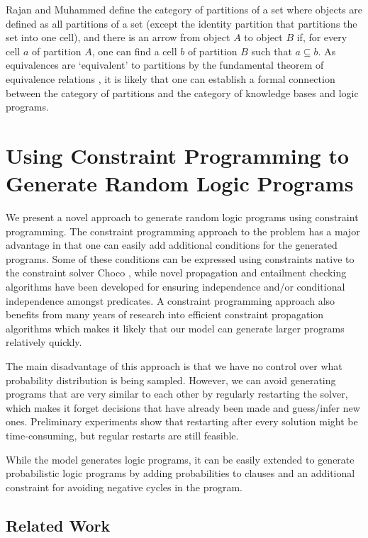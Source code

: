 \documentclass{article}
\begin{document}
Rajan and Muhammed \cite{rajan2015normal} define the category of partitions of a
set where objects are defined as all partitions of a set (except the identity
partition that partitions the set into one cell), and there is an arrow from
object $A$ to object $B$ if, for every cell $a$ of partition $A$, one can find a
cell $b$ of partition $B$ such that $a \subseteq b$. As equivalences are
`equivalent' to partitions by the fundamental theorem of equivalence relations
\cite{dummit2004abstract}, it is likely that one can establish a formal
connection between the category of partitions and the category of knowledge
bases and logic programs.

\section{Using Constraint Programming to Generate Random Logic Programs}

We present a novel approach to generate random logic programs using constraint
programming. The constraint programming approach to the problem has a major
advantage in that one can easily add additional conditions for the generated
programs. Some of these conditions can be expressed using constraints native to
the constraint solver Choco \cite{choco}, while novel propagation and entailment
checking algorithms have been developed for ensuring independence and/or
conditional independence amongst predicates. A constraint programming approach
also benefits from many years of research into efficient constraint propagation
algorithms which makes it likely that our model can generate larger programs
relatively quickly.

The main disadvantage of this approach is that we have no control over what
probability distribution is being sampled. However, we can avoid generating
programs that are very similar to each other by regularly restarting the solver,
which makes it forget decisions that have already been made and guess/infer new
ones. Preliminary experiments show that restarting after every solution might be
time-consuming, but regular restarts are still feasible.

While the model generates logic programs, it can be easily extended to generate
probabilistic logic programs by adding probabilities to clauses and an
additional constraint for avoiding negative cycles in the program.

\subsection{Related Work}
\end{document}
